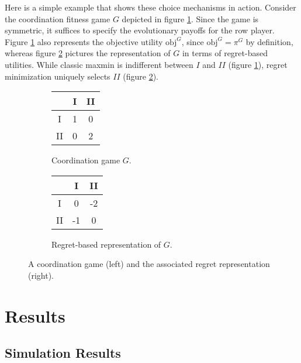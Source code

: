 \documentclass[fleqn,reqno,12pt]{article}
\theoremstyle{Satz}
\theoremstyle{Bsp}
\begin{document}
Here is a simple example that shows these choice mechanisms in action. Consider the
coordination fitness game $G$ depicted in figure \ref{coordgame1}. Since the
game is symmetric, it suffices to specify the evolutionary payoffs for the row player. Figure
\ref{coordgame1} also represents the objective utility $\text{obj}^G$, since
$\text{obj}^G= \pi^G$ by definition, whereas figure \ref{coordgame1reg} pictures the
representation of $G$ in terms of regret-based utilities. While classic maxmin is indifferent
between $I$ and $II$ (figure \ref{coordgame1}), regret minimization uniquely selects $II$
(figure \ref{coordgame1reg}).
\begin{figure}
\begin{center}
  \begin{subfigure}[b]{0.3\textwidth}
    \centering
    \begin{tabular}{ccc}
      \toprule
      & I & II \\
      \midrule
      I & 1 & 0 \\
      II & 0 & 2\\
      \bottomrule
    \end{tabular}
    \caption{Coordination game $G$.}
    \label{coordgame1}
  \end{subfigure}
  \hspace{1cm}
  \begin{subfigure}[b]{0.5\textwidth}
    \centering
    \begin{tabular}{ccc}
      \toprule
      & I & II \\
      \midrule
      I & 0 & -2 \\
      II & -1 & 0\\
      \bottomrule
    \end{tabular}
    \caption{Regret-based representation of $G$.}
    \label{coordgame1reg}
  \end{subfigure}
  \caption{A coordination game (left) and the associated regret representation (right).}
    \label{coordgame1mainFig}
    \end{center}
\end{figure}


\section{Results}\label{sec:results}

\subsection{Simulation Results}
\label{sec:simulation-results}
\end{document}
